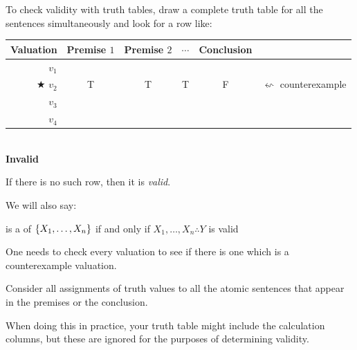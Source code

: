 \begin{highlighted}
	To check {validity} with truth tables, draw a complete truth table for all the sentences simultaneously and look for a row like:
	
	\begin{center}
		\begin{tabular}{r || c |c |c || c c}
			Valuation & Premise $1$ & Premise $2$ & $\cdots$ & Conclusion\\
			\hline
			$v_1$&&&&\\
			$\bigstar$ $v_2$  & T & T & T & {F} &$\leftsquigarrow$ counterexample\\
			$v_3$&&&&\\
			$v_4$&&&&
		\end{tabular}\\ \textbf{Invalid}
	\end{center}
	
	
	If there is no such row, then it is \emph{valid}. 
\end{highlighted}


We will also say:
\begin{definition}
	\metaY is a  of $\{X_1,\ldots,X_n\}$ if and only if $X_1,\ldots,X_n\therefore Y$ is {valid}
\end{definition}

One needs to check every valuation to see if there is one which is a counterexample valuation. 

Consider all assignments of truth values to all the atomic sentences that appear in the premises or the conclusion.

When doing this in practice, your truth table might include the calculation columns, but these are ignored for the purposes of determining validity. 

